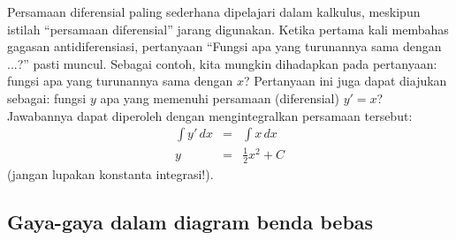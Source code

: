 Persamaan diferensial paling sederhana dipelajari dalam kalkulus,
meskipun istilah ``persamaan diferensial'' jarang digunakan. Ketika
pertama kali membahas gagasan antidiferensiasi, pertanyaan ``Fungsi
apa yang turunannya sama dengan ...?'' pasti muncul. Sebagai contoh,
kita mungkin dihadapkan pada pertanyaan: fungsi apa yang turunannya
sama dengan $x$? Pertanyaan ini juga dapat diajukan sebagai: fungsi
$y$ apa yang memenuhi persamaan (diferensial) $y'=x$? Jawabannya
dapat diperoleh dengan mengintegralkan persamaan tersebut:
\begin{eqnarray*}
\int y'\,dx & = & \int x\,dx\\
y & = & \frac{1}{2}x^{2}+C
\end{eqnarray*}
 (jangan lupakan konstanta integrasi!).

\subsection{Gaya-gaya dalam diagram benda bebas}

